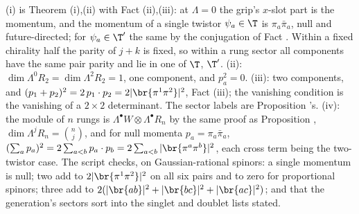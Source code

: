 (i) is Theorem (i),(ii) with Fact (ii),(iii): at $\Lambda = 0$ the grip's $x$-slot part is the momentum, and the momentum of a single twistor $\psi_{a} \in \T$ is $\pi_{a}\bar\pi_{a}$, null and future-directed; for $\psi_{a} \in \T'$ the same by the conjugation of Fact . Within a fixed chirality half the parity of $j + k$ is fixed, so within a rung sector all components have the same pair parity and lie in one of $\T$, $\T'$. (ii): $\dim\Lambda^{0}R_{2} = \dim\Lambda^{2}R_{2} = 1$, one component, and $p_{a}^{2} = 0$. (iii): two components, and $(p_{1} + p_{2})^{2} = 2\,p_{1} \cdot p_{2} = 2|\br{\pi^{1}\pi^{2}}|^{2}$, Fact (iii); the vanishing condition is the vanishing of a $2 \times 2$ determinant. The sector labels are Proposition 's. (iv): the module of $n$ rungs is $\Lambda^{\bullet}W \otimes \Lambda^{\bullet}R_{n}$ by the same proof as Proposition , $\dim\Lambda^{j}R_{n} = \binom{n}{j}$, and for null momenta $p_{a} = \pi_{a}\bar\pi_{a}$, $(\sum_{a} p_{a})^{2} = 2\sum_{a<b}p_{a} \cdot p_{b} = 2\sum_{a<b}|\br{\pi^{a}\pi^{b}}|^{2}$, each cross term being the two-twistor case. The script checks, on Gaussian-rational spinors: a single momentum is null; two add to $2|\br{\pi^{1}\pi^{2}}|^{2}$ on all six pairs and to zero for proportional spinors; three add to $2(|\br{ab}|^{2} + |\br{bc}|^{2} + |\br{ac}|^{2})$; and that the generation's sectors sort into the singlet and doublet lists stated.
